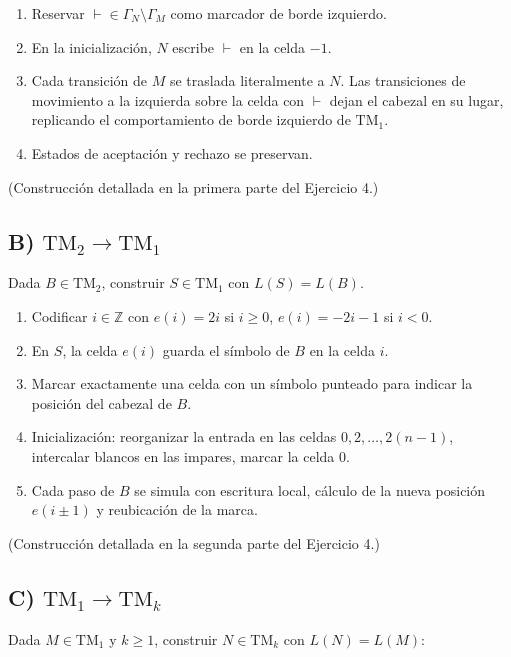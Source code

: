 \documentclass[11pt,a4paper]{article}
\theoremstyle{plain}
\theoremstyle{definition}
\theoremstyle{remark}
\newcommand{\TM}{\mathrm{TM}}
\newcommand{\TMtwo}{\TM_{2}}
\newcommand{\TMone}{\TM_{1}}
\newcommand{\TMk}{\TM_{k}}
\begin{document}
\begin{enumerate}
  \item Reservar $\vdash\in\Gamma_N\setminus\Gamma_M$ como marcador de borde
        izquierdo.
  \item En la inicializaci\'on, $N$ escribe $\vdash$ en la celda $-1$.
  \item Cada transici\'on de $M$ se traslada literalmente a $N$. Las
        transiciones de movimiento a la izquierda sobre la celda con
        $\vdash$ dejan el cabezal en su lugar, replicando el comportamiento
        de borde izquierdo de $\TMone$.
  \item Estados de aceptaci\'on y rechazo se preservan.
\end{enumerate}

(Construcci\'on detallada en la primera parte del Ejercicio 4.)

\subsection*{B) $\TMtwo \to \TMone$}

Dada $B\in\TMtwo$, construir $S\in\TMone$ con $L(S)=L(B)$.

\begin{enumerate}
  \item Codificar $i\in\mathbb Z$ con $e(i)=2i$ si $i\ge 0$, $e(i)=-2i-1$ si
        $i<0$.
  \item En $S$, la celda $e(i)$ guarda el s\'imbolo de $B$ en la celda $i$.
  \item Marcar exactamente una celda con un s\'imbolo punteado para indicar
        la posici\'on del cabezal de $B$.
  \item Inicializaci\'on: reorganizar la entrada en las celdas $0,2,\dots,2(n-1)$,
        intercalar blancos en las impares, marcar la celda $0$.
  \item Cada paso de $B$ se simula con escritura local, c\'alculo de la
        nueva posici\'on $e(i\pm 1)$ y reubicaci\'on de la marca.
\end{enumerate}

(Construcci\'on detallada en la segunda parte del Ejercicio 4.)

\subsection*{C) $\TMone \to \TMk$}

Dada $M\in\TMone$ y $k\ge 1$, construir $N\in\TMk$ con $L(N)=L(M)$:
\end{document}
